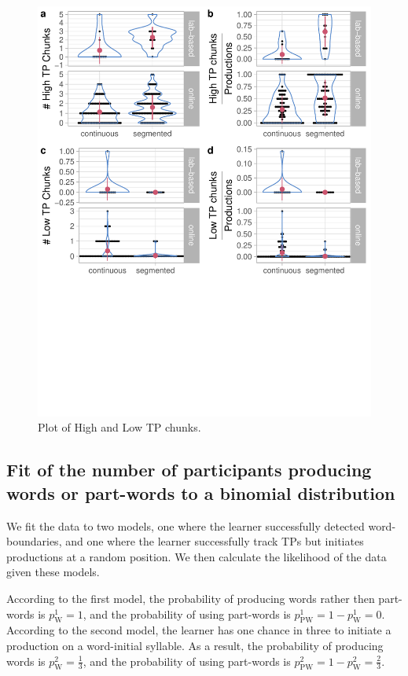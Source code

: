 \documentclass[]{article}
\begin{document}
\begin{figure}

{\centering \includegraphics[width=0.8\linewidth]{segmentation_recall_combined_files/figure-latex/recall-tp-chunks-raw-plot-1} 

}

\caption{Plot of High and Low TP chunks.}\label{fig:recall-tp-chunks-raw-plot}
\end{figure}

\clearpage

\subsection{Fit of the number of participants producing words or part-words to a binomial distribution}\label{app:likelihood}

We fit the data to two models, one where the learner successfully detected word-boundaries, and one where the learner successfully track TPs but initiates productions at a random position. We then calculate the likelihood of the data given these models.

According to the first model, the probability of producing words rather then part-words is \(p^1_{\text{W}} = 1\), and the probability of using part-words is \(p^1_{\text{PW}} = 1 - p^1_{\text{W}} = 0\). According to the second model, the learner has one chance in three to initiate a production on a word-initial syllable. As a result, the probability of producing words is \(p^2_{\text{W}} = \frac{1}{3}\), and the probability of using part-words is \(p^2_{\text{PW}} = 1 - p^2_{\text{W}} = \frac{2}{3}\).
\end{document}
